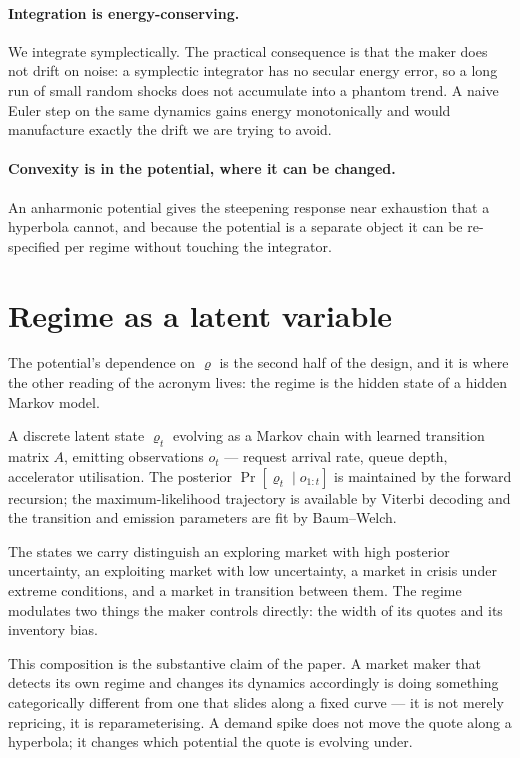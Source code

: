 \documentclass[11pt,a4paper]{article}
\begin{document}
\paragraph{Integration is energy-conserving.} We integrate symplectically. The
practical consequence is that the maker does not drift on noise: a symplectic
integrator has no secular energy error, so a long run of small random shocks does
not accumulate into a phantom trend. A naive Euler step on the same dynamics
gains energy monotonically and would manufacture exactly the drift we are trying
to avoid.

\paragraph{Convexity is in the potential, where it can be changed.} An anharmonic
potential gives the steepening response near exhaustion that a hyperbola cannot,
and because the potential is a separate object it can be re-specified per regime
without touching the integrator.

\section{Regime as a latent variable}

The potential's dependence on $\varrho$ is the second half of the design, and it
is where the other reading of the acronym lives: the regime is the hidden state
of a hidden Markov model.

\begin{definition}
A discrete latent state $\varrho_{t}$ evolving as a Markov chain with learned
transition matrix $A$, emitting observations $o_{t}$ --- request arrival rate,
queue depth, accelerator utilisation. The posterior $\Pr[\varrho_{t} \mid
o_{1:t}]$ is maintained by the forward recursion; the maximum-likelihood
trajectory is available by Viterbi decoding and the transition and emission
parameters are fit by Baum--Welch.
\end{definition}

The states we carry distinguish an exploring market with high posterior
uncertainty, an exploiting market with low uncertainty, a market in crisis under
extreme conditions, and a market in transition between them. The regime modulates
two things the maker controls directly: the width of its quotes and its inventory
bias.

This composition is the substantive claim of the paper. A market maker that
detects its own regime and changes its dynamics accordingly is doing something
categorically different from one that slides along a fixed curve --- it is not
merely repricing, it is reparameterising. A demand spike does not move the quote
along a hyperbola; it changes which potential the quote is evolving under.
\end{document}
